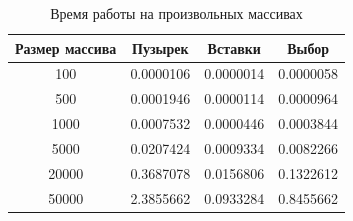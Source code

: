 \documentclass[a4paper,12pt]{article}
\begin{document}
	\begin{table}[H]
	\caption{\label{tabular:test_time3} Время работы на произвольных массивах}
	\begin{center}	    
	\begin{tabular}{|c|c|c|c|}        				
        				\hline
        				Размер массива & Пузырек & Вставки & Выбор       \\ 
        				\hline
        				100    &0.0000106 &0.0000014 &0.0000058\\ 
        				500    &0.0001946 &0.0000114 &0.0000964\\
        				1000   &0.0007532 &0.0000446 &0.0003844\\ 
        				5000   &0.0207424 &0.0009334 &0.0082266\\
        				20000  &0.3687078 &0.0156806 &0.1322612\\
        				50000  &2.3855662 &0.0933284 &0.8455662\\
        				\hline
	\end{tabular}
	\end{center}
	\end{table}
		
\end{document}

